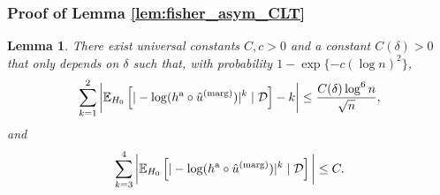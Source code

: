 \documentclass[11pt]{article}
\newtheorem{lemma}{Lemma}
\def\E{\mathbb{E}}
\def\marg{\textnormal{(marg)}}
\def\asym{\textnormal{a}}
\newcommand{\D}{\mathcal{D}}
\begin{document}
\subsubsection{Proof of Lemma \ref{lem:fisher_asym_CLT}}\label{subsec:lem_fisher_asym_CLT}
\begin{lemma}\label{lem:cond_moments}
  There exist universal constants $C, c > 0$ and a constant $C(\delta) > 0$ that only depends on $\delta$ such that, with probability $1 - \exp\{-c(\log n)^2\}$,
  \begin{equation}
    \label{eq:k=12}
    \sum_{k=1}^{2}\bigg|\E_{H_0}\left[|-\log (h^\asym \circ \hat{u}^\marg)|^k\mid \D\right] - k\bigg| \le \frac{C(\delta)\log^6 n}{\sqrt{n}},
  \end{equation}
  and
  \begin{equation}
    \label{eq:k=34}
    \sum_{k=3}^{4}\bigg|\E_{H_0}\left[|-\log (h^\asym \circ \hat{u}^\marg)|^k\mid \D\right]\bigg|\le C.
  \end{equation}
\end{lemma}
\end{document}
